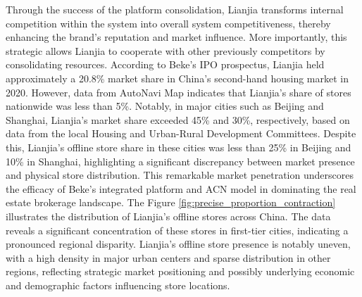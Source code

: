 \documentclass[11pt]{article}
\begin{document}
Through the success of the platform consolidation, Lianjia transforms internal competition within the system into overall system competitiveness, thereby enhancing the brand's reputation and market influence. More importantly, this strategic allows Lianjia to cooperate with other previously competitors by consolidating resources. According to Beke's IPO prospectus, Lianjia held approximately a 20.8\% market share in China's second-hand housing market in 2020. However, data from AutoNavi Map indicates that Lianjia's share of stores nationwide was less than 5\%. Notably, in major cities such as Beijing and Shanghai, Lianjia's market share exceeded 45\% and 30\%, respectively, based on data from the local Housing and Urban-Rural Development Committees. Despite this, Lianjia's offline store share in these cities was less than 25\% in Beijing and 10\% in Shanghai, highlighting a significant discrepancy between market presence and physical store distribution. This remarkable market penetration underscores the efficacy of Beke's integrated platform and ACN model in dominating the real estate brokerage landscape. The Figure \ref{fig:precise_proportion_contraction} illustrates the distribution of Lianjia's offline stores across China. The data reveals a significant concentration of these stores in first-tier cities, indicating a pronounced regional disparity. Lianjia's offline store presence is notably uneven, with a high density in major urban centers and sparse distribution in other regions, reflecting strategic market positioning and possibly underlying economic and demographic factors influencing store locations. 




\end{document}
